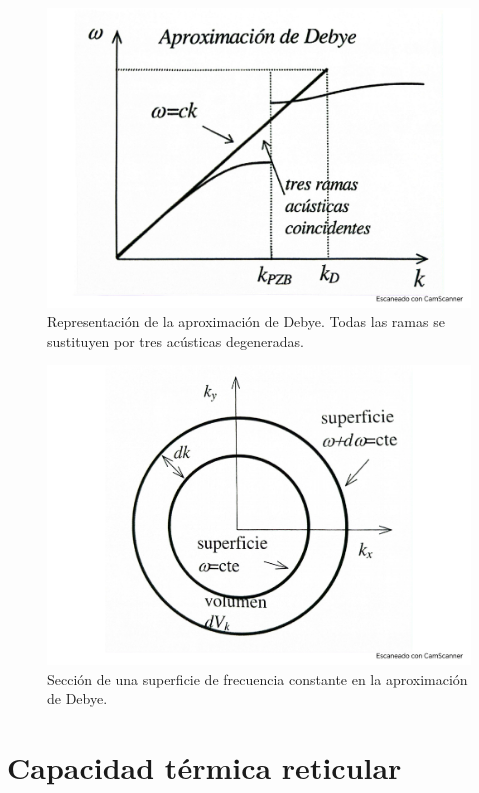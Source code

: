 \begin{figure}[h!] \centering
    \includegraphics[scale=0.35]{Cuerpo/Ch_05/Fotos libro 2.pdf}
    \caption{Representación de la aproximación de Debye. Todas las ramas se sustituyen por tres acústicas degeneradas.}
    \label{Fig:05-02}
\end{figure}



\begin{figure}[h!] \centering
    \includegraphics[scale=0.35]{Cuerpo/Ch_05/Fotos libro 3.pdf}
    \caption{Sección de una superficie de frecuencia constante en la aproximación de Debye.}
    \label{Fig:05-03}
\end{figure}    

\section{Capacidad térmica reticular}

